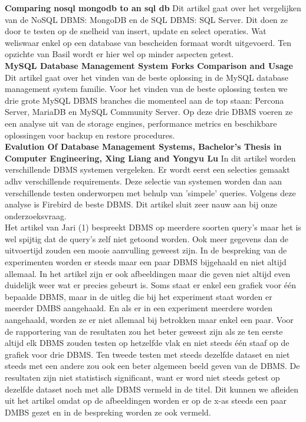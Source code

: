 \documentclass[fleqn,10pt]{artikeltin}
\begin{document}
\textbf{Comparing nosql mongodb to an sql db}
Dit artikel gaat over het vergelijken van de NoSQL DBMS: MongoDB en de SQL DBMS: SQL Server. Dit doen ze door te testen op de snelheid van insert, update en select operaties. Wat weliswaar enkel op een database van bescheiden formaat wordt uitgevoerd. Ten opzichte van Basil wordt er hier wel op minder aspecten getest.\\

\textbf{MySQL Database Management System Forks Comparison and Usage}
Dit artikel gaat over het vinden van de beste oplossing in de MySQL database management system familie. Voor het vinden van de beste oplossing testen we drie grote MySQL DBMS branches die momenteel aan de top staan: Percona Server, MariaDB en MySQL Community Server. Op deze drie DBMS voeren ze een analyse uit van de storage engines, performance metrics en beschikbare oplossingen voor backup en restore procedures.\\

\textbf{Evalution Of Database Management Systems, Bachelor's Thesis in Computer Engineering, Xing Liang and Yongyu Lu}
In dit artikel worden verschillende DBMS systemen vergeleken. Er wordt eerst een selecties gemaakt adhv verschillende requirements. Deze selectie van systemen worden dan aan verschillende testen onderworpen met behulp van 'simpele' queries. Volgens deze analyse is Firebird de beste DBMS. Dit artikel sluit zeer nauw aan bij onze onderzoeksvraag.\\


Het artikel van Jari (1) bespreekt DBMS op meerdere soorten query’s maar het is wel spijtig dat de query’s zelf niet getoond worden. Ook meer gegevens dan de uitvoertijd zouden een mooie aanvulling geweest zijn. In de bespreking van de experimenten worden er steeds maar een paar DBMS bijgehaald en niet altijd allemaal. In het artikel zijn er ook afbeeldingen maar die geven niet altijd even duidelijk weer wat er precies gebeurt is. Soms staat er enkel een grafiek voor één bepaalde DBMS, maar in de uitleg die bij het experiment staat worden er meerder DMBS aangehaald. En als er in een experiment meerdere worden aangehaald, worden ze er niet allemaal bij betrokken maar enkel een paar. Voor de rapportering van de resultaten zou het beter geweest zijn als ze ten eerste altijd elk DBMS zouden testen op hetzelfde vlak en niet steeds één staaf op de grafiek voor drie DBMS. Ten tweede testen met steeds dezelfde dataset en niet steeds met een andere zou ook een beter algemeen beeld geven van de DBMS. De resultaten zijn niet statistisch significant, want er word niet steeds getest op dezelfde dataset noch met alle DBMS vermeld in de titel. Dit kunnen we afleiden uit het artikel omdat op de afbeeldingen worden er op de x-as steeds een paar DMBS gezet en in de bespreking worden ze ook vermeld.\\
\end{document}
